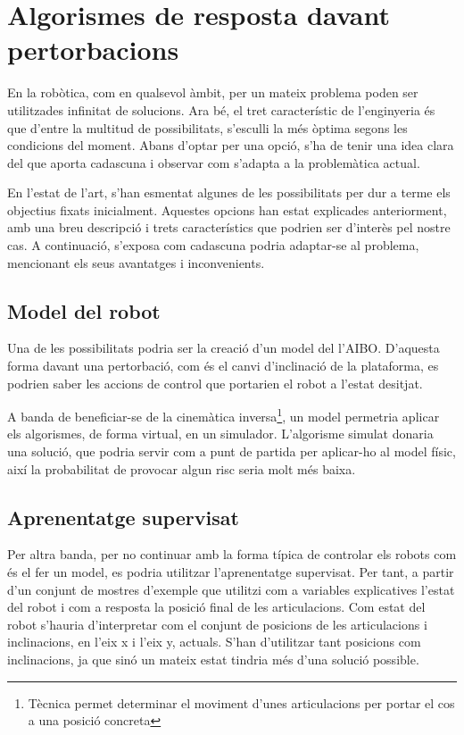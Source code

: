 \documentclass[12pt,a4paper,final,twoside]{report}
\begin{document}
\section{Algorismes de resposta davant pertorbacions}
\label{Algorismes}

En la robòtica, com en qualsevol àmbit, per un mateix problema poden ser utilitzades infinitat de solucions. Ara bé, el tret característic de l'enginyeria és que d'entre la multitud de possibilitats, s'esculli la més òptima segons les condicions del moment. Abans d'optar per una opció, s'ha de tenir una idea clara del que aporta cadascuna i observar com s'adapta a la problemàtica actual.

En l'estat de l'art, s'han esmentat algunes de les possibilitats per dur a terme els objectius fixats inicialment. Aquestes opcions han estat explicades anteriorment, amb una breu descripció i trets característics que podrien ser d'interès pel nostre cas. A continuació, s'exposa com cadascuna podria adaptar-se al problema, mencionant els seus avantatges i inconvenients.

\subsection{Model del robot}

Una de les possibilitats podria ser la creació d'un model del l'AIBO. D'aquesta forma davant una pertorbació, com és el canvi d'inclinació de la plataforma, es podrien saber les accions de control que portarien el robot a l'estat desitjat.

A banda de beneficiar-se de la cinemàtica inversa\footnote{Tècnica permet determinar el moviment d'unes articulacions per portar el cos a una posició concreta}, un model permetria aplicar els algorismes, de forma virtual, en un simulador. L'algorisme simulat donaria una solució, que podria servir com a punt de partida per aplicar-ho al model físic, així la probabilitat de provocar algun risc seria molt més baixa.

\subsection{Aprenentatge supervisat}

Per altra banda, per no continuar amb la forma típica de controlar els robots com és el fer un model, es podria utilitzar l'aprenentatge supervisat. Per tant, a partir d'un conjunt de mostres d'exemple que utilitzi com a variables explicatives l'estat del robot i com a resposta la posició final de les articulacions. Com estat del robot s'hauria d'interpretar com el conjunt de posicions de les articulacions i inclinacions, en l'eix x i l'eix y, actuals. S'han d'utilitzar tant posicions com inclinacions, ja que sinó un mateix estat tindria més d'una solució possible.
\end{document}
